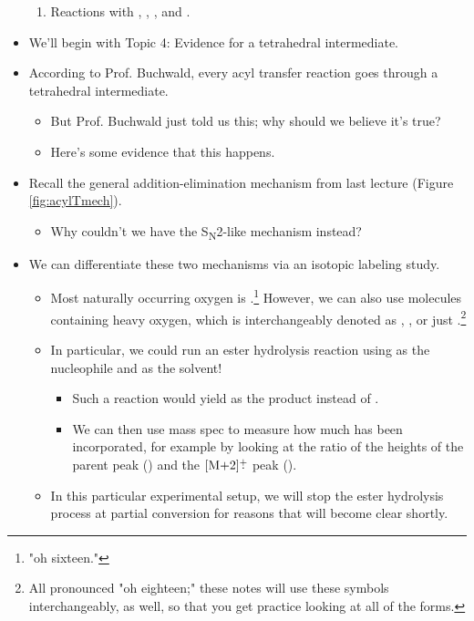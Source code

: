 \documentclass[../notes.tex]{subfiles}
\begin{document}
\begin{itemize}
\begin{enumerate}[start=4]
        \item Reactions with , , , and .
    \end{enumerate}
    \item We'll begin with Topic 4: Evidence for a tetrahedral intermediate.
    \item According to Prof. Buchwald, every acyl transfer reaction goes through a tetrahedral intermediate.
    \begin{itemize}
        \item But Prof. Buchwald just told us this; why should we believe it's true?
        \item Here's some evidence that this happens.
    \end{itemize}
    \item Recall the general addition-elimination mechanism from last lecture (Figure \ref{fig:acylTmech}).
    \begin{itemize}
        \item Why couldn't we have the S\textsubscript{N}2-like mechanism instead?
    \end{itemize}
    \pagebreak
    \item We can differentiate these two mechanisms via an isotopic labeling study. 
    \begin{itemize}
        \item Most naturally occurring oxygen is .\footnote{"oh sixteen."} However, we can also use molecules containing heavy oxygen, which is interchangeably denoted as , \ce{{}^18\fO}, or just \ce{\fO}.\footnote{All pronounced "oh eighteen;" these notes will use these symbols interchangeably, as well, so that you get practice looking at all of the forms.}
        \item In particular, we could run an ester hydrolysis reaction using  as the nucleophile and  as the solvent!
        \begin{itemize}
            \item Such a reaction would yield  as the product instead of .
            \item We can then use mass spec to measure how much  has been incorporated, for example by looking at the ratio of the heights of the parent peak () and the $\cnc{M$+2$}\rc$ peak ().
        \end{itemize}
        \item In this particular experimental setup, we will stop the ester hydrolysis process at partial conversion for reasons that will become clear shortly.

\end{itemize}
\end{itemize}
\end{document}
